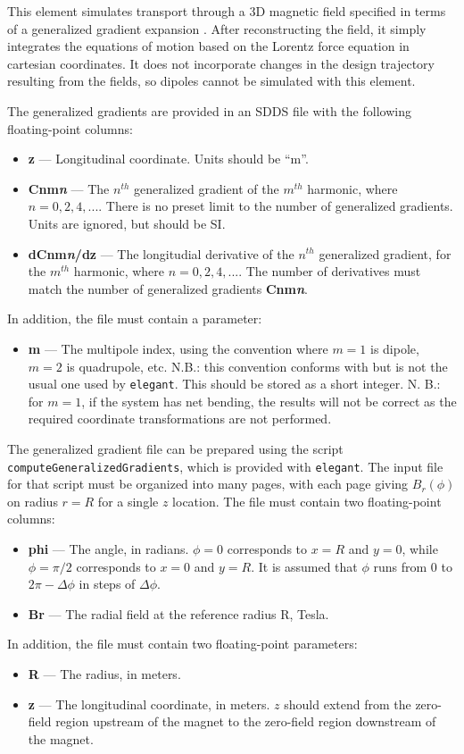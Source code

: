 This element simulates transport through a 3D magnetic field
specified in terms of a generalized gradient expansion \cite{Venturini-NIMA427-387}.
After reconstructing the field, it simply integrates the equations of motion
based on the Lorentz force equation in cartesian coordinates.  It does not
incorporate changes in the design trajectory resulting from the
fields, so dipoles cannot be simulated with this element.

The generalized gradients are provided in an SDDS file with the following floating-point columns:
\begin{itemize}
\item {\bf z} --- Longitudinal coordinate. Units should be ``m''.
\item {\bf Cnm{\em n}} --- The $n^{th}$ generalized gradient of the $m^{th}$ harmonic, where $n=0,2,4,...$.
  There is no preset limit to the number of generalized gradients. Units are ignored,
  but should be SI.
\item {\bf dCnm{\em n}/dz} --- The longitudial derivative of the $n^{th}$ generalized gradient, 
  for the $m^{th}$ harmonic, where $n=0,2,4,...$.
  The number of derivatives must match the number of generalized gradients {\bf Cnm{\em n}}.
\end{itemize}
In addition, the file must contain a parameter:
\begin{itemize}
\item {\bf m} --- The multipole index, using the convention where $m=1$ is dipole, $m=2$ is quadrupole,
  etc. N.B.: this convention conforms with \cite{Venturini-NIMA427-387} but is not the usual one used by
  {\tt elegant}. This should be stored as a short integer.
  N. B.: for $m=1$, if the system has net bending, the results will not be correct as the required coordinate
  transformations are not performed.
\end{itemize}

The generalized gradient file can be prepared using the script {\tt computeGeneralizedGradients}, which is
provided with {\tt elegant}. The input file for that script must be organized into many pages, with
each page giving $B_r(\phi)$ on radius $r=R$ for a single $z$ location. The file must contain two floating-point columns:
\begin{itemize}
\item {\bf phi} --- The angle, in radians. $\phi=0$ corresponds to $x=R$ and $y=0$, while $\phi=\pi/2$ corresponds
  to $x=0$ and $y=R$. It is assumed that $\phi$ runs from $0$ to $2\pi - \Delta \phi$ in steps of $\Delta \phi$.
\item {\bf Br} --- The radial field at the reference radius R, Tesla.
\end{itemize}
In addition, the file must contain two floating-point parameters:
\begin{itemize}
\item {\bf R} --- The radius, in meters. 
\item {\bf z} --- The longitudinal coordinate, in meters. $z$ should extend from the zero-field region upstream of the magnet to 
  the zero-field region downstream of the magnet.
\end{itemize}

